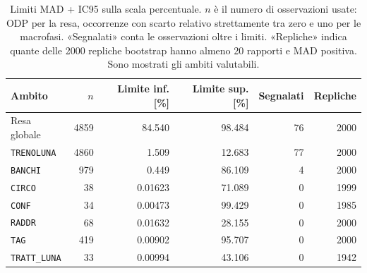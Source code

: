 \begin{table}[htbp]
\centering
\small
{}
\begin{tabularx}{\linewidth}{@{}Xrrrrr@{}}
\toprule
\textbf{Ambito} & $n$ & \textbf{Limite inf. [\%]} & \textbf{Limite sup. [\%]} & \textbf{Segnalati} & \textbf{Repliche} \\
\midrule
Resa globale & \num{4859} & \num{84.540} & \num{98.484} & \num{76} & \num{2000} \\
\texttt{TRENOLUNA} & \num{4860} & \num{1.509} & \num{12.683} & \num{77} & \num{2000} \\
\texttt{BANCHI} & \num{979} & \num{0.449} & \num{86.109} & \num{4} & \num{2000} \\
\texttt{CIRCO} & \num{38} & \num{0.01623} & \num{71.089} & \num{0} & \num{1999} \\
\texttt{CONF} & \num{34} & \num{0.00473} & \num{99.429} & \num{0} & \num{1985} \\
\texttt{RADDR} & \num{68} & \num{0.01632} & \num{28.155} & \num{0} & \num{2000} \\
\texttt{TAG} & \num{419} & \num{0.00902} & \num{95.707} & \num{0} & \num{2000} \\
\texttt{TRATT\_LUNA} & \num{33} & \num{0.00994} & \num{43.106} & \num{0} & \num{1942} \\
\bottomrule
\end{tabularx}
\caption{Limiti MAD + IC95 sulla scala percentuale. $n$ è il numero di osservazioni usate: ODP per la resa, occorrenze con scarto relativo strettamente tra zero e uno per le macrofasi. «Segnalati» conta le osservazioni oltre i limiti. «Repliche» indica quante delle \num{2000} repliche bootstrap hanno almeno 20 rapporti e MAD positiva. Sono mostrati gli ambiti valutabili.}
\label{tab:mass-outlier-thresholds}
\end{table}
